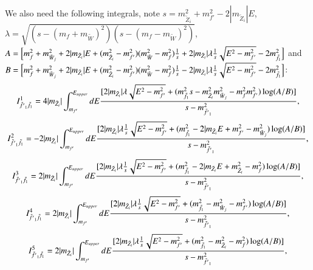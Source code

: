 \documentclass[final,3p,times,pdflatex]{elsarticle}
\begin{document}
We also need the following integrals, note $s = m_{\tilde{Z}_i}^2 + m_{f'}^2 - 2|m_{\tilde{Z}_i}|E$, $\lambda = \sqrt{(s-(m_{f}+m_{\tilde{W}})^2)(s-(m_{f}-m_{\tilde{W}})^2)}$, $A = \Big[m_{f}^2 + m_{\tilde{W}_j}^2 + 2|m_{\tilde{Z}_i}|E + (m_{\tilde{Z}_i}^2 - m_{f'}^2)(m_{\tilde{W}}^2 - m_{f}^2){1 \over s} + 2|m_{\tilde{Z}_i}| \lambda {1 \over s} \sqrt{E^2 - m_{f'}^2}  - 2m_{\tilde{f}_1}^2\Big]$ and $B = \Big[m_{f}^2 + m_{\tilde{W}_j}^2 + 2|m_{\tilde{Z}_i}|E + (m_{\tilde{Z}_i}^2 - m_{f'}^2)(m_{\tilde{W}}^2 - m_{f}^2){1 \over s} - 2|m_{\tilde{Z}_i}|\lambda {1 \over s} \sqrt{E^2 - m_{f'}^2} - 2m_{\tilde{f}_1}^2\Big]$:
\begin{equation}
\begin{aligned}
I_{\tilde{f'}_1 \tilde{f}_1}^{1} = 4|m_{\tilde{Z}_i}| \int_{m_{f'}}^{E_{upper}} dE {[2|m_{\tilde{Z}_i}| \lambda \sqrt{E^2 - m_{f'}^2}  + (m_{\tilde{f}_1}^2 s - m_{\tilde{Z}_i}^2 m_{\tilde{W}_j}^2 - m_{f}^2 m_{f'}^2) \log(A/B)] \over s - m_{\tilde{f'}_1}^2},
\end{aligned}
\end{equation}
\begin{equation}
\begin{aligned}
I_{\tilde{f'}_1 \tilde{f}_1}^{2} = -2|m_{\tilde{Z}_i}| \int_{m_{f'}}^{E_{upper}} dE {[2|m_{\tilde{Z}_i}| \lambda {1 \over s} \sqrt{E^2-m_{f'}^2}  + (m_{\tilde{f}_1}^2 - 2|m_{\tilde{Z}_i}E + m_{f'}^2 - m_{\tilde{W}_j}^2)\log(A/B)]  \over s - m_{\tilde{f'}_1}^2},
\end{aligned}
\end{equation}
\begin{equation}
\begin{aligned}
I_{\tilde{f'}_1 \tilde{f}_1}^{3} = 2|m_{\tilde{Z}_i}| \int_{m_{f'}}^{E_{upper}} dE {[2|m_{\tilde{Z}_i}|\lambda {1 \over s}\sqrt{E^2-m_{f'}^2}  + (m_{\tilde{f}_1}^2 - 2|m_{\tilde{Z}_i}E + m_{\tilde{Z}_i}^2 - m_{f}^2)\log(A/B)]  \over s - m_{\tilde{f'}_1}^2},
\end{aligned}
\end{equation}
\begin{equation}
\begin{aligned}
I_{\tilde{f'}_1 \tilde{f}_1}^{4} = 2|m_{\tilde{Z}_i}| \int_{m_{f'}}^{E_{upper}} dE {[2|m_{\tilde{Z}_i}|\lambda {1 \over s}\sqrt{E^2-m_{f'}^2} + (m_{\tilde{f}_1}^2 - m_{\tilde{W}_j}^2 - m_{f'}^2)\log(A/B)]  \over s - m_{\tilde{f'}_1}^2},
\end{aligned}
\end{equation}
\begin{equation}
\begin{aligned}
I_{\tilde{f'}_1 \tilde{f}_1}^{5} = 2|m_{\tilde{Z}_i}| \int_{m_{f'}}^{E_{upper}} dE {[2|m_{\tilde{Z}_i}| \lambda {1 \over s} \sqrt{E^2-m_{f'}^2}  + (m_{\tilde{f}_1}^2 - m_{\tilde{Z}_i}^2 - m_{f}^2)\log(A/B)]  \over s - m_{\tilde{f'}_1}^2},
\end{aligned}
\end{equation}
\end{document}
